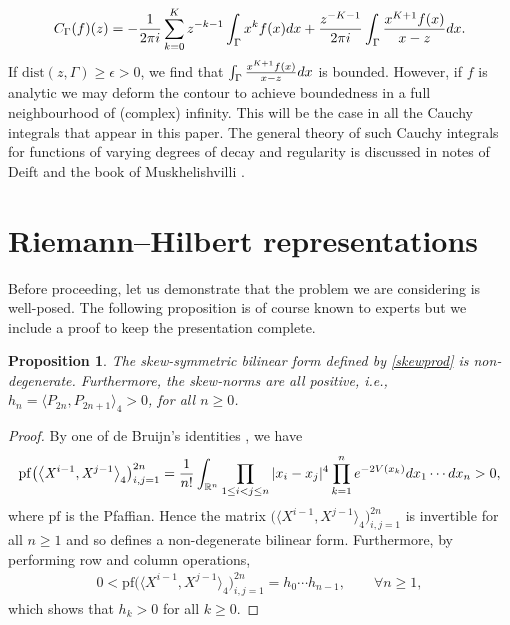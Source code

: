 \documentclass[11pt]{article}
\numberwithin{equation}{section}
\numberwithin{equation}{section}
\newtheorem{Proposition}[Theorem]{Proposition}
\begin{document}
\begin{enumerate}
\begin{align*}
C_\Gamma (f)(z) = - \frac{1}{2\pi {\rm i}} \sum_{k=0}^K z^{-k-1} \int_\Gamma x^k f(x) {\rm d}x +\frac{z^{-K-1}}{2\pi {\rm i} } \int_\Gamma \frac{ x^{K+1} f(x)}{x-z} {\rm d}x .
\end{align*}
If $\mathrm{dist}(z,\Gamma) \geq \epsilon > 0$, we find that $\int_\Gamma \frac{ x^{K+1} f(x)}{x-z} {\rm d}x$ is bounded. However, if $f$ is analytic we may deform the contour to achieve boundedness in a full neighbourhood of (complex) infinity. This will be the case in all the Cauchy integrals that appear in this paper. The general theory of such Cauchy integrals for functions of varying degrees of decay and regularity is discussed in notes of Deift \cite{deift2019riemannhilbert} and the book of Muskhelishvilli \cite{singular}.
\end{enumerate}

\section{Riemann--Hilbert representations}\label{rhpsection}

Before proceeding, let us demonstrate that the problem we are considering is well-posed. The following proposition is of course known to experts but we include a proof to keep the presentation complete.
\begin{Proposition} The skew-symmetric bilinear form defined by \eqref{skewprod} is non-degenerate. Furthermore, the skew-norms are all positive, i.e., $h_n = \langle P_{2n}, P_{2n+1} \rangle_4 > 0$, for all $n \geq 0$.
\end{Proposition}
\begin{proof}
By one of de Bruijn's identities \cite{debruijn}, we have
\begin{equation*}
\mathrm{pf} \big( \big\langle \mathit{X}^{i-1}, \mathit{X}^{j-1} \big\rangle_4 \big)_{i,j=1}^{2n} = \frac{1}{n!} \int_{\mathbb{R}^n} \prod_{1 \leq i < j \leq n} |x_i - x_j|^4 \prod_{k=1}^n {\rm e}^{-2V(x_k)} {\rm d} x_1 \cdots {\rm d}x_n > 0,
\end{equation*}
where $\mathrm{pf}$ is the Pfaffian. Hence the matrix $\big( \big\langle \mathit{X}^{i-1}, \mathit{X}^{j-1} \big\rangle_4 \big)_{i,j=1}^{2n}$ is invertible for all $n \geq 1$ and so defines a non-degenerate bilinear form. Furthermore, by performing row and column operations,
 \begin{align*}
0 < \mathrm{pf} \big( \big\langle \mathit{X}^{i-1}, \mathit{X}^{j-1} \big\rangle_4 \big)_{i,j=1}^{2n} = h_0 \cdots h_{n-1},\qquad \forall n \geq 1,
\end{align*}
which shows that $h_k > 0$ for all $k \geq 0$.
\end{proof}
\end{document}
